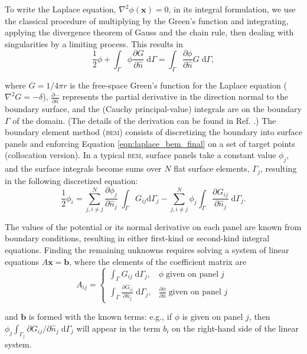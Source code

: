 \documentclass[final,3p,times]{elsarticle}
\newcommand{\bem}{\textsc{bem}\xspace}
\newcommand{\di}[1]{\text{d}#1}
\newcommand{\partiald}[2]{\frac{\partial #1}{\partial #2}}
\newcommand{\partialdi}[2]{\partial #1 / \partial #2}
\newcommand{\nhat}{\hat{n}}
\newcommand{\vect}[1]{\mathbf{#1}}
\begin{document}
To write the Laplace equation, $\nabla^{2}\phi(\vect{x}) = 0$,  in its integral formulation, we use the classical procedure of multiplying by the Green's function and integrating, applying the divergence theorem of Gauss and the chain rule, then dealing with singularities by a limiting process. This results in
%
\begin{equation}\label{eqn:laplace_bem_final}
	\frac{1}{2}\phi + \int_{\Gamma} \phi\partiald{G}{\nhat}\;\di{\Gamma} = \int_{\Gamma}\partiald{\phi}{\nhat}G\;\di{\Gamma},
\end{equation}

\noindent where $G = 1/4\pi r$ is the free-space Green's function for the Laplace equation ($\nabla^{2}G = -\delta$),  $\partiald{\cdots}{\nhat}$ represents the partial derivative in the direction normal to the boundary surface, and the (Cauchy principal-value) integrals are on the boundary $\Gamma$ of the domain. (The details of the derivation can be found in Ref. \cite{BrebbiaDominguez1992}.) The boundary element method (\bem) consists of discretizing the boundary into surface panels and enforcing Equation \eqref{eqn:laplace_bem_final} on a set of target points (collocation version). In a typical \bem, surface panels take a constant value $\phi_j$, and the surface integrals become sums over $N$ flat surface elements, $\Gamma_j$, resulting in the following discretized equation:
%
\begin{equation}
	\frac{1}{2}\phi_i = \sum_{j, i \neq j}^{N} \partiald{\phi_j}{\nhat_j}\;\int_{\Gamma}G_{ij}\di{\Gamma_j} - \sum_{j, i \neq j}^{N} \phi_j\int_{\Gamma}\partiald{G_{ij}}{\nhat_j}\;\di{\Gamma_j}.
\end{equation}

The values of the potential or its normal derivative on each panel are known from boundary conditions, resulting in either first-kind or second-kind integral equations. Finding the remaining unknowns requires solving a system of linear equations $A\vect{x}=\vect{b}$, where the elements of the coefficient matrix are
%
\begin{equation} \label{eqn:laplace_matrix}
	A_{ij} = 
	\begin{cases}
		\int_{\Gamma} G_{ij}\;\di{\Gamma_j}, & \phi\;\text{given on panel}\;j \\
		\int_{\Gamma} \partiald{G_{ij}}{\nhat_j}\;\di{\Gamma_j}, & \partiald{\phi}{\nhat}\;\text{given on panel } j
	\end{cases}
\end{equation}

\noindent
and $\vect{b}$ is formed with the known terms: e.g., if $\phi$ is given on panel $j$, then $\phi_j\int_{\Gamma_j}\partialdi{G_{ij}}{\nhat_j}\;\di{\Gamma_j}$ will appear in the term $b_i$ on the right-hand side of the linear system.
\end{document}

